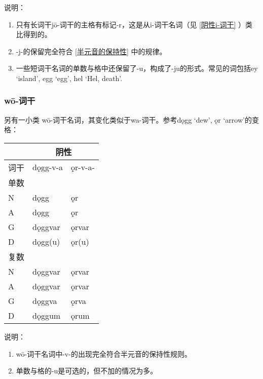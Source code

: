 说明：

\begin{enumerate}

  \item
        只有长词干jō-词干的主格有标记-r，这是从i-词干名词（见 \ref{阴性i-词干} ）类比得到的。
  \item
        -j-的保留完全符合 \ref{半元音的保持性} 中的规律。
  \item
        一些短词干名词的单数与格中还保留了-u，构成了-ju的形式。常见的词包括ey
        `island', egg `egg', hel `Hel, death'.
\end{enumerate}

\subsubsection{wō-词干}

另有一小类 wō-词干名词，其变化类似于wa-词干。参考dǫgg `dew', ǫr `arrow'的变格：

\begin{longtable}{lll}
  \toprule
     & \multicolumn{2}{c}{\textbf{阴性}}           \\
  \midrule
  \endhead
  \bottomrule
  \endfoot
  词干 & dǫgg-v-a                        & ǫr-v-a- \\
  单数 &                                 &         \\
  N  & dǫgg                            & ǫr      \\
  A  & dǫgg                            & ǫr      \\
  G  & dǫggvar                         & ǫrvar   \\
  D  & dǫgg(u)                         & ǫr(u)   \\
  复数 &                                 &         \\
  N  & dǫggvar                         & ǫrvar   \\
  A  & dǫggvar                         & ǫrvar   \\
  G  & dǫggva                          & ǫrva    \\
  D  & dǫggum                          & ǫrum    \\
\end{longtable}

说明：

\begin{enumerate}

  \item
        wō-词干名词中-v-的出现完全符合半元音的保持性规则。
  \item
        单数与格的-u是可选的，但不加的情况为多。
\end{enumerate}


